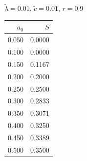 \documentclass[11pt,a4paper,dvipsnames,twosided]{article}
\begin{document}
\begin{minipage}[t]{\textwidth}
\begin{minipage}[t]{0.32\textwidth}
        \footnotesize
        \begin{flushleft}$\tilde{\lambda}=0.01$, $\tilde{c}=0.01$, $r=0.9$\end{flushleft}
        \begin{tabular}[t]{rr}
            $a_0$ & $S$ \\
            \hline
             0.050 & 0.0000 \\
             0.100 & 0.0000 \\
             0.150 & 0.1167 \\
             0.200 & 0.2000 \\
             0.250 & 0.2500 \\
             0.300 & 0.2833 \\
             0.350 & 0.3071 \\
             0.400 & 0.3250 \\
             0.450 & 0.3389 \\
             0.500 & 0.3500 \\
        \end{tabular}
    \end{minipage}
\end{minipage}
\end{document}
